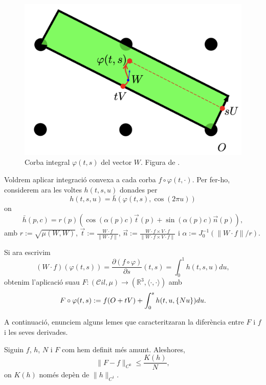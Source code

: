 \begin{figure}[htbp]
    \centering
    \includegraphics[height=0.33\textwidth]{W.png}
    \caption{Corba integral $\varphi(t,s)$ del vector $W$. Figura de \cite{borrelli2013}.}
    \label{fig:vuitena_foto}
\end{figure}

Voldrem aplicar integració convexa a cada corba $f\circ\varphi(t,\cdot)$. Per fer-ho, considerem ara les voltes $h(t,s,u)$ donades per
\begin{equation}
    h(t,s,u) = \bar h(\varphi(t,s), \cos(2\pi u))
\end{equation}
on 
\begin{equation*}
    \bar h(p, c) = r(p)\left( \cos(\alpha(p)c)\vec t(p) + \sin(\alpha(p)c)\vec n(p) \right),
\end{equation*}
amb $r:=\sqrt{\mu(W,W)}$, $\vec t := \frac{W\cdot f}{\|W\cdot f\|}$, $\vec n := \frac{W\cdot f\times V\cdot f}{\|W\cdot f\times V\cdot f\|}$ i $\alpha:= J_0^{-1}(\|W\cdot f\|/r)$.

Si ara escrivim 
\begin{equation*}
    (W\cdot f)(\varphi(t,s)) = \frac{\partial(f\circ\varphi)}{\partial s}(t,s)= \int_0^1 h(t,s,u) du,
\end{equation*}
obtenim l'aplicació suau $F:(\mathcal Cil, \mu)\to(\mathbb R^3, \langle\cdot, \cdot\rangle)$ amb
\begin{equation}
    F\circ\varphi(t,s) := f(O+tV) + \int_0^s h(t,u,\{Nu\}) du.
\end{equation}

A continuació, enunciem alguns lemes que caracteritzaran la diferència entre $F$ i $f$ i les seves derivades.

\begin{lema}
    \label{lema:lema2}
    Siguin $f$, $h$, $N$ i $F$ com hem definit més amunt. Aleshores,
    \begin{equation*}
        \|F-f\|_{C^0} \le \frac{K(h)}{N},
    \end{equation*}
    on $K(h)$ només depèn de $\|h\|_{C^1}$.
\end{lema}

